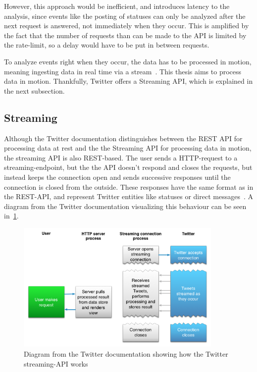 However, this approach would be inefficient, and introduces latency to the analysis,
since events like the posting of statuses can only be analyzed after the next request is answered, not immediately when they occur.
This is amplified by the fact that the number of requests than can be made to the API is limited by the rate-limit,
so a delay would have to be put in between requests.

To analyze events right when they occur, the data has to be processed in motion, meaning ingesting data in real time via a stream~\cite{Nandi2015}.
This thesis aims to process data in motion.
Thankfully, Twitter offers a Streaming API, which is explained in the next subsection.


\subsection{Streaming}
\label{subsec:streaming}

Although the Twitter documentation distinguishes between the REST API for processing data at rest and the the Streaming API for processing data in motion,
the streaming API is also REST-based.
The user sends a HTTP-request to a streaming-endpoint, but the the API doesn't respond and closes the requests,
but instead keeps the connection open and sends successive responses until the connection is closed from the outside.
These responses have the same format as in the REST-API, and represent Twitter entities like statuses or direct messages~\cite{twitterDocs}.
A diagram from the Twitter documentation visualizing this behaviour can be seen in~\cref{fig:twitter_streaming}.

\begin{figure}
    \centering
    \caption{Diagram from the Twitter documentation showing how the Twitter streaming-API works~\cite{twitterDocs}}
    \label{fig:twitter_streaming}
    \includegraphics[width=10cm]{../images/twitter_streaming_diagram.png}
\end{figure}

